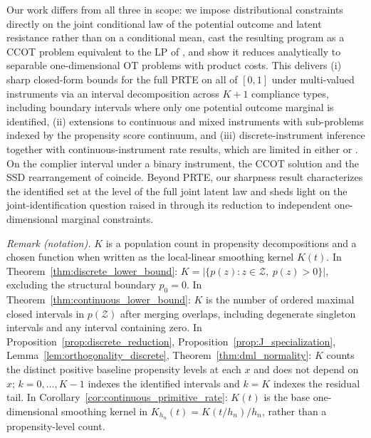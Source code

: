 Our work differs from all three in scope: we impose distributional constraints directly on the joint conditional law of the potential outcome and latent resistance rather than on a conditional mean, cast the resulting program as a CCOT problem equivalent to the LP of \citet{han_yang2024computational}, and show it reduces analytically to separable one-dimensional OT problems with product costs. This delivers (i) sharp closed-form bounds for the full PRTE on all of $[0,1]$ under multi-valued instruments via an interval decomposition across $K\!+\!1$ compliance types, including boundary intervals where only one potential outcome marginal is identified, (ii) extensions to continuous and mixed instruments with sub-problems indexed by the propensity score continuum, and (iii) discrete-instrument inference together with continuous-instrument rate results, which are limited in either \citet{marx2024sharp} or \citet{han_yang2024computational}. On the complier interval under a binary instrument, the CCOT solution and the SSD rearrangement of \citet{marx2024sharp} coincide. Beyond PRTE, our sharpness result characterizes the identified set at the level of the full joint latent law and sheds light on the joint-identification question raised in \citet{marx2024sharp} through its reduction to independent one-dimensional marginal constraints.

\noindent\textit{Remark (notation).} $K$ is a population count in propensity decompositions and a chosen function when written as the local-linear smoothing kernel $K(t)$. In Theorem~\ref{thm:discrete_lower_bound}: $K=|\{p(z):z\in\mathcal Z,\ p(z)>0\}|$, excluding the structural boundary $p_0=0$. In Theorem~\ref{thm:continuous_lower_bound}: $K$ is the number of ordered maximal closed intervals in $p(\mathcal Z)$ after merging overlaps, including degenerate singleton intervals and any interval containing zero. In Proposition~\ref{prop:discrete_reduction}, Proposition~\ref{prop:J_specialization}, Lemma~\ref{lem:orthogonality_discrete}, Theorem~\ref{thm:dml_normality}: $K$ counts the distinct positive baseline propensity levels at each $x$ and does not depend on $x$; $k=0,\ldots,K-1$ indexes the identified intervals and $k=K$ indexes the residual tail. In Corollary~\ref{cor:continuous_primitive_rate}: $K(t)$ is the base one-dimensional smoothing kernel in $K_{h_n}(t)=K(t/h_n)/h_n$, rather than a propensity-level count.


